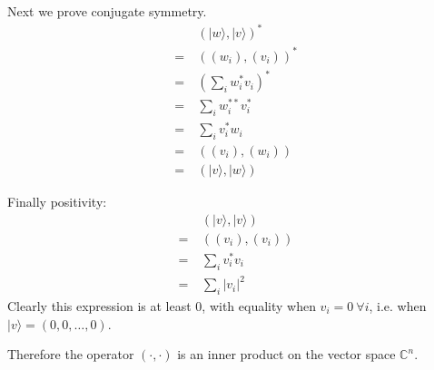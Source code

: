 \documentclass[]{article}
\begin{document}
Next we prove conjugate symmetry.
\begin{align*}
&(|w\rangle, |v\rangle)^* \\
=\ &((w_i), (v_i))^* \\
=\ &\left(\sum_iw_i^*v_i\right)^* \\
=\ &\sum_iw_i^{**}v_i^* \\
=\ &\sum_iv_i^*w_i \\
=\ &((v_i), (w_i)) \\
=\ &(|v\rangle, |w\rangle)
\end{align*}

Finally positivity:
\begin{align*}
&(|v\rangle, |v\rangle) \\
=\ &((v_i), (v_i)) \\
=\ &\sum_iv_i^*v_i \\
=\ &\sum_i|v_i|^2
\end{align*}
Clearly this expression is at least 0, with equality when $v_i = 0\ \forall i$, i.e. when $|v\rangle = (0, 0, \ldots, 0)$.

Therefore the operator $(\cdot, \cdot)$ is an inner product on the vector space $\mathbb{C}^n$.
\end{document}
